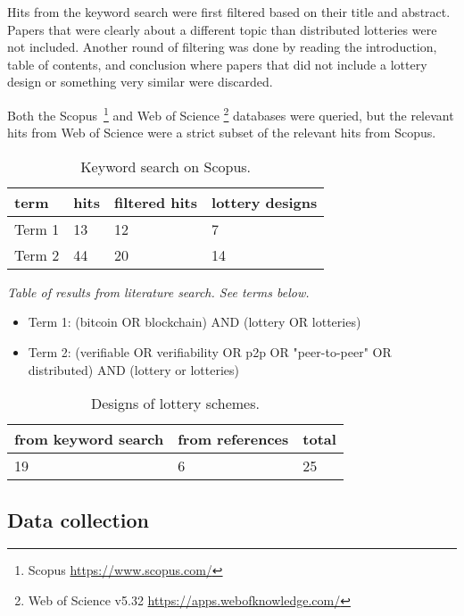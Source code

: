 Hits from the keyword search were first filtered based on their title and abstract. Papers that were clearly about a different topic than distributed lotteries were not included. Another round of filtering was done by reading the introduction, table of contents, and conclusion where papers that did not include a lottery design or something very similar were discarded. 

Both the Scopus~\footnote{Scopus \url{https://www.scopus.com/}} and Web of Science \footnote{Web of Science v5.32 \url{https://apps.webofknowledge.com/}} databases were queried, but the relevant hits from Web of Science were a strict subset of the relevant hits from Scopus.

\begin{table}[h]
\centering
\caption{Keyword search on Scopus.}
\begin{tabular}{|l|l|l|l|}
\hline

term & hits & filtered hits & lottery designs \\ \hline
Term 1 & 13 & 12 & 7 \\ \hline
Term 2 & 44 & 20 & 14 \\ \hline

\end{tabular}
\end{table}
\begin{center}
    \emph{Table of results from literature search. See terms below.}
\end{center}

\begin{itemize}
    \item Term 1: (bitcoin OR blockchain) AND (lottery OR lotteries) 
    \item Term 2: (verifiable OR verifiability OR p2p OR "peer-to-peer" OR distributed) AND (lottery or lotteries)
\end{itemize}

\begin{table}[h]
\centering
\caption{Designs of lottery schemes.}
\begin{tabular}{|l|l|l|}
\hline

from keyword search & from references & total \\ \hline
19 & 6 & 25 \\ \hline

\end{tabular}
\end{table}

\subsection{Data collection}

